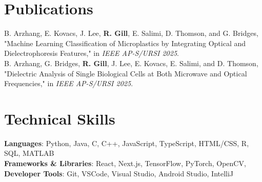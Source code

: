 \documentclass[letterpaper,11pt]{article}
\makeatletter
\newcommand{\resumeProjectHeading}[2]{
    \item
    \begin{tabular*}{0.97\textwidth}{l@{\extracolsep{\fill}}r}
      \small#1 & #2 \\
    \end{tabular*}\vspace{-7pt}
}
\newcommand{\resumeSubHeadingListStart}{\begin{itemize}[leftmargin=0.15in, label={}]}
\newcommand{\resumeSubHeadingListEnd}{\end{itemize}}
\makeatother
\begin{document}
    


\section{Publications}
\begin{itemize}[leftmargin=0.15in, label={}]
  \small{\item{
    B. Arzhang, E. Kovacs, J. Lee, \textbf{R. Gill}, E. Salimi, D. Thomson, and G. Bridges, "Machine Learning Classification of Microplastics by Integrating Optical and Dielectrophoresis Features," in \textit{IEEE AP-S/URSI 2025}. \\
    B. Arzhang, G. Bridges, \textbf{R. Gill}, J. Lee, E. Kovacs, E. Salimi, and D. Thomson, "Dielectric Analysis of Single Biological Cells at Both Microwave and Optical Frequencies," in \textit{IEEE AP-S/URSI 2025}. \\
  }}
\end{itemize}



\section{Technical Skills}
\begin{itemize}[leftmargin=0.15in, label={}]
  \small{\item{
  \textbf{Languages}{: Python, Java, C, C++, JavaScript, TypeScript, HTML/CSS, R, SQL, MATLAB} \\
  \textbf{Frameworks \& Libraries}{: React, Next.js, TensorFlow, PyTorch, OpenCV, } \\
  \textbf{Developer Tools}{: Git, VSCode, Visual Studio, Android Studio, IntelliJ} \\
  }}
\end{itemize}

\end{document}
